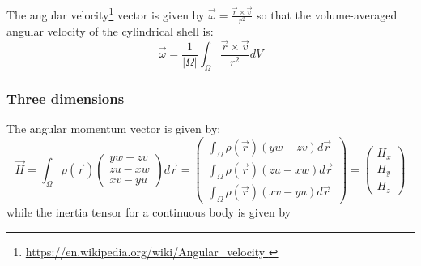 The angular velocity\footnote{\url{https://en.wikipedia.org/wiki/Angular_velocity }}
 vector is given by $\vec\omega = \frac{\vec r\times \vec v}{r^2}$
so that the volume-averaged angular velocity of the cylindrical shell is:
\begin{equation}
\vec {\omega} = \frac{1}{|\Omega|} \int_\Omega \frac{{\vec r}\times {\vec v}}{r^2} dV
\end{equation}


\subsubsection{Three dimensions}

The angular momentum vector is given by:
\begin{equation}
\vec H 
= \int_\Omega \rho(\vec r) \left( 
\begin{array}{c} 
yw-zv \\ zu-xw \\ xv-yu 
\end{array} \right) d\vec r
= 
\left(\begin{array}{c} 
\int_\Omega \rho(\vec r) (yw-zv) d\vec r\\
\int_\Omega \rho(\vec r) (zu-xw) d\vec r\\
\int_\Omega \rho(\vec r) (xv-yu) d\vec r
\end{array} \right)
= 
\left( 
\begin{array}{c} 
H_x \\ H_y \\ H_z
\end{array} \right)
\end{equation}
while the inertia tensor for a continuous body is given 
by
